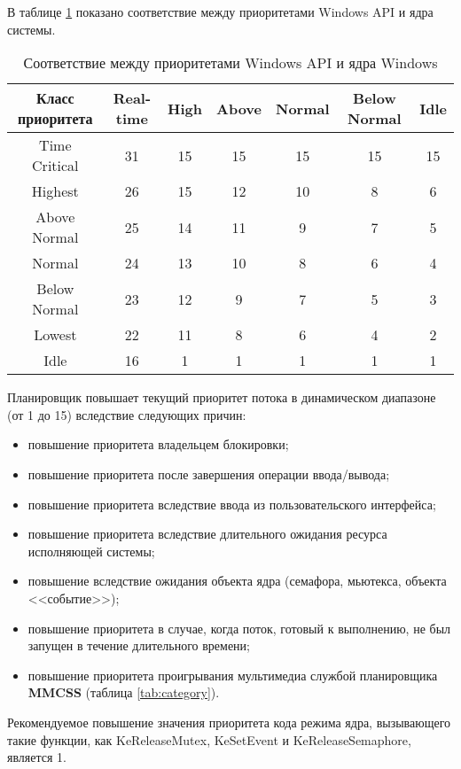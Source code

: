 В таблице \ref{tab:prioritet} показано соответствие между приоритетами Windows API и ядра системы.

\begin{table}[!h]
	\caption{Соответствие между приоритетами Windows API и ядра Windows}
	\begin{center}
		\begin{tabular}{|c|c|c|c|c|c|c|}
			\hline
			Класс приоритета & Real-time & High & Above &
			Normal & Below Normal & Idle \\ \hline
			Time Critical & 31 & 15 & 15 & 15 & 15 & 15 \\ \hline
			Highest & 26 & 15 & 12 & 10 & 8 & 6 \\ \hline
			Above Normal & 25 & 14 & 11 & 9 & 7 & 5 \\ \hline
			Normal & 24 & 13 & 10 & 8 & 6 & 4 \\ \hline
			Below Normal & 23 & 12 & 9 & 7 & 5 & 3 \\ \hline
			Lowest & 22 & 11 & 8 & 6 & 4 & 2 \\ \hline
			Idle & 16 & 1 & 1 & 1 & 1 & 1 \\ \hline
		\end{tabular}
	\end{center}
	\label{tab:prioritet}
\end{table}

Планировщик повышает текущий приоритет потока в динамическом диапазоне (от 1 до 15) вследствие следующих причин:
\begin{itemize}
	\item повышение приоритета владельцем блокировки;
	\item повышение приоритета после завершения операции ввода/вывода;
	\item повышение приоритета вследствие ввода из пользовательского интерфейса;
	\item повышение приоритета вследствие длительного ожидания ресурса исполняющей системы;
	\item повышение вследствие ожидания объекта ядра (семафора, мьютекса, объекта <<событие>>);
	\item повышение приоритета в случае, когда поток, готовый к выполнению, не был запущен в течение длительного времени;
	\item повышение приоритета проигрывания мультимедиа службой планировщика \textbf{MMCSS} (таблица \ref{tab:category}).
\end{itemize}

Рекомендуемое повышение значения приоритета кода режима ядра, вызывающего такие функции, как KeReleaseMutex, KeSetEvent и KeReleaseSemaphore, является 1.

